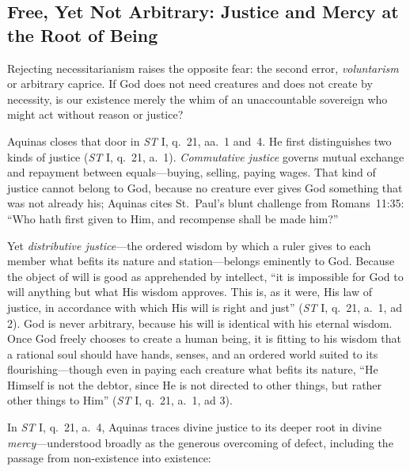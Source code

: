 \subsection{Free, Yet Not Arbitrary: Justice and Mercy at the Root of Being}

Rejecting necessitarianism raises the opposite fear: the second error, \emph{voluntarism} or arbitrary caprice. If God does not need creatures and does not create by necessity, is our existence merely the whim of an unaccountable sovereign who might act without reason or justice?

Aquinas closes that door in \emph{ST} I, q.\ 21, aa.\ 1 and~4. He first distinguishes two kinds of justice (\emph{ST} I, q.\ 21, a.\ 1). \emph{Commutative justice} governs mutual exchange and repayment between equals---buying, selling, paying wages. That kind of justice cannot belong to God, because no creature ever gives God something that was not already his; Aquinas cites St.\ Paul's blunt challenge from Romans~11:35: ``Who hath first given to Him, and recompense shall be made him?''

Yet \emph{distributive justice}---the ordered wisdom by which a ruler gives to each member what befits its nature and station---belongs eminently to God. Because the object of will is good as apprehended by intellect, ``it is impossible for God to will anything but what His wisdom approves. This is, as it were, His law of justice, in accordance with which His will is right and just'' (\emph{ST} I, q.\ 21, a.\ 1, ad 2). God is never arbitrary, because his will is identical with his eternal wisdom. Once God freely chooses to create a human being, it is fitting to his wisdom that a rational soul should have hands, senses, and an ordered world suited to its flourishing---though even in paying each creature what befits its nature, ``He Himself is not the debtor, since He is not directed to other things, but rather other things to Him'' (\emph{ST} I, q.\ 21, a.\ 1, ad 3).

In \emph{ST} I, q.\ 21, a.\ 4, Aquinas traces divine justice to its deeper root in divine \emph{mercy}---understood broadly as the generous overcoming of defect, including the passage from non-existence into existence:

